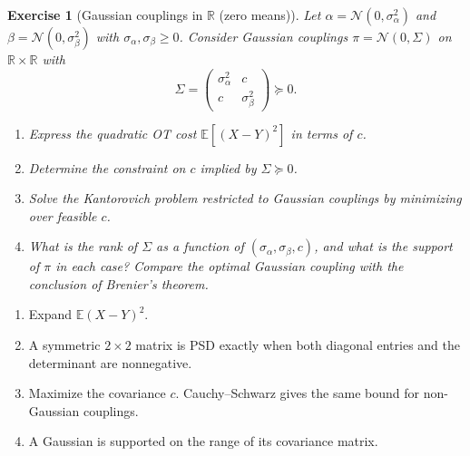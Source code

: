 \documentclass[11pt,a4paper]{article}
\theoremstyle{exostyle}
\newtheorem{exercise}{Exercise}
\newcommand{\R}{\mathbb{R}}
\begin{document}
\begin{exercise}[Gaussian couplings in $\R$ (zero means)]\label{ex:gauss1d}
Let $\alpha=\mathcal N(0,\sigma_\alpha^2)$ and $\beta=\mathcal N(0,\sigma_\beta^2)$ with $\sigma_\alpha,\sigma_\beta\ge0$.
Consider \emph{Gaussian} couplings $\pi=\mathcal N(0,\Sigma)$ on $\R\times\R$ with
\[
\Sigma=\begin{pmatrix}\sigma_\alpha^2 & c\\[2pt] c & \sigma_\beta^2\end{pmatrix}\succeq0.
\]
\begin{enumerate}[label=(\alph*), itemsep=4pt]
\item Express the quadratic OT cost $\mathbb E[(X-Y)^2]$ in terms of $c$.
\item Determine the constraint on $c$ implied by $\Sigma\succeq0$.
\item Solve the Kantorovich problem \emph{restricted to Gaussian couplings} by minimizing over feasible $c$.
\item What is the rank of $\Sigma$ as a function of $(\sigma_\alpha,\sigma_\beta,c)$, and what is the support of $\pi$ in each case?
    Compare the optimal Gaussian coupling with the conclusion of Brenier's theorem.
\end{enumerate}
\end{exercise}
\begin{hints}
\begin{enumerate}[label=(\alph*)]\item Expand $\mathbb E(X-Y)^2$.\item A symmetric $2\times2$ matrix is PSD exactly when both diagonal entries and the determinant are nonnegative.\item Maximize the covariance $c$. Cauchy--Schwarz gives the same bound for non-Gaussian couplings.\item A Gaussian is supported on the range of its covariance matrix.\end{enumerate}
\end{hints}
\end{document}

